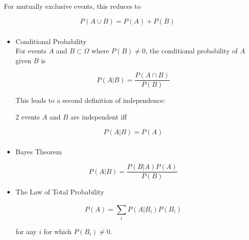 \documentclass[t,xcolor=pdftex,dvipsnames,table]{beamer}\usepackage[]{graphicx}\usepackage[]{color}
\begin{document}
\begin{frame}{}

For mutually exclusive events, this reduces to

\[ \boxed{ P(A \cup B) = P(A) + P(B) } \]

\vspace{.5cm}
\begin{center}
\end{center}
\end{frame}
 
\begin{frame}\frametitle{} 
\begin{itemize}

\item Conditional Probability \\
For events $A$ and $B \subset \Omega$ where $P(B) \neq 0$, the conditional probability of $A$ given $B$ is

\[  \boxed{ P(A | B) = \frac{ P(A \cap B)}{P(B)} } \]

\vspace{.5cm}
This leads to a second definition of independence:

2 events $A$ and $B$ are independent iff

\[ \boxed{ P(A | B) = P(A)  }\]

\end{itemize}
\end{frame}

\begin{frame}\frametitle{} 
\begin{itemize}

\item Bayes Theorem

\[  \boxed{ P(A | B) = \frac{ P(B | A) P(A)}{P(B)} } \]

\href{https://en.wikipedia.org/wiki/Confusion_of_the_inverse}{}

\vspace{.5cm}
\item The Law of Total Probability
 
 \[ \boxed{  P(A) = \sum_{i}^{} P(A | B_{i}) P(B_{i}) } \]
 
 for any $i$ for which $P(B_{i}) \neq 0$.

\end{itemize}
\end{frame}
\end{document}
